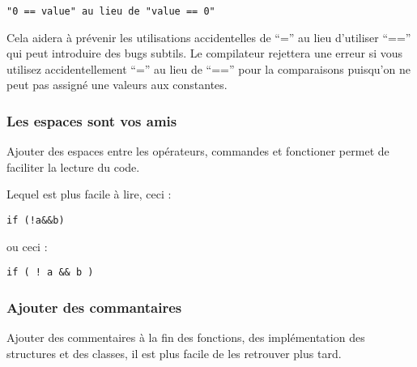 \begin{verbatim}
"0 == value" au lieu de "value == 0"
\end{verbatim}

Cela aidera à prévenir les utilisations accidentelles de ``='' au lieu d'utiliser ``=='' qui peut introduire des bugs subtils. Le compilateur rejettera une erreur si vous utilisez accidentellement ``='' au lieu de ``=='' pour la comparaisons puisqu'on ne peut pas assigné une valeurs aux constantes.

\subsubsection{Les espaces sont vos amis}
Ajouter des espaces entre les opérateurs, commandes et fonctioner permet de faciliter la lecture du code.

Lequel est plus facile à lire, ceci :

\begin{verbatim}
if (!a&&b)
\end{verbatim}

ou ceci :

\begin{verbatim}
if ( ! a && b )
\end{verbatim}

\subsubsection{Ajouter des commantaires}
Ajouter des commentaires à la fin des fonctions, des implémentation des structures et des classes, il est plus facile de les retrouver plus tard.

